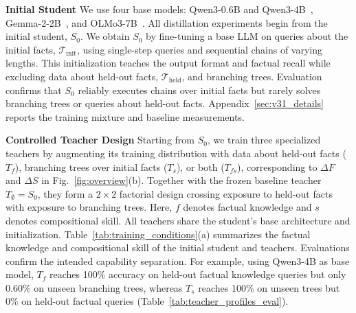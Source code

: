 \documentclass[]{template}
\theoremstyle{plain}
\theoremstyle{definition}
\theoremstyle{remark}
\renewcommand{\paragraph}[1]{\vspace{1mm}\noindent\textbf{#1}}
\begin{document}
\paragraph{Initial Student}
\label{sec:student_pretraining}
We use four base models: Qwen3-0.6B and Qwen3-4B~\citep{2025qwen3}, Gemma-2-2B~\citep{team2024gemma}, and OLMo3-7B~\citep{olmo2025olmo}. All distillation experiments begin from the initial student, $S_0$. We obtain $S_0$ by fine-tuning a base LLM on queries about the initial facts, $\mathcal{T}_{\mathrm{init}}$, using single-step queries and sequential chains of varying lengths. This initialization teaches the output format and factual recall while excluding data about held-out facts, $\mathcal{T}_{\mathrm{held}}$, and branching trees. Evaluation confirms that $S_0$ reliably executes chains over initial facts but rarely solves branching trees or queries about held-out facts. Appendix~\ref{sec:v31_details} reports the training mixture and baseline measurements.

\paragraph{Controlled Teacher Design}
\label{sec:teacher_design}
Starting from $S_0$, we train three specialized teachers by augmenting its training distribution with data about held-out facts ($T_f$), branching trees over initial facts ($T_s$), or both ($T_{fs}$), corresponding to $\Delta F$ and $\Delta S$ in Fig.~\ref{fig:overview}(b). Together with the frozen baseline teacher $T_\emptyset=S_0$, they form a $2\times2$ factorial design crossing exposure to held-out facts with exposure to branching trees. Here, $f$ denotes factual knowledge and $s$ denotes compositional skill. All teachers share the student's base architecture and initialization. Table~\ref{tab:training_conditions}(a) summarizes the factual knowledge and compositional skill of the initial student and teachers. Evaluations confirm the intended capability separation. For example, using Qwen3-4B as base model,  \(T_f\) reaches 100\% accuracy on held-out factual knowledge queries but only 0.60\% on unseen branching trees, whereas \(T_s\) reaches 100\% on unseen trees but 0\% on held-out factual queries (Table~\ref{tab:teacher_profiles_eval}).
\end{document}
